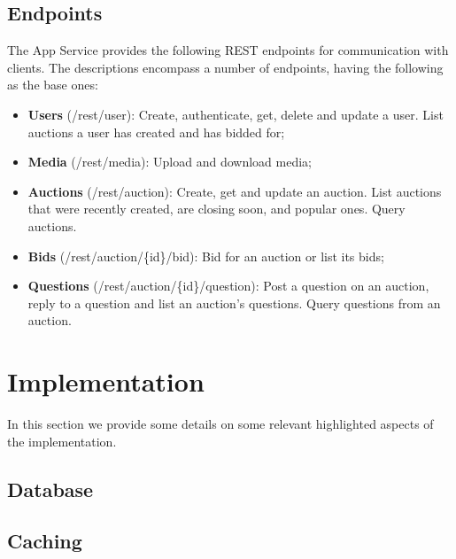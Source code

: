 \documentclass[runningheads]{llncs}
\begin{document}
\subsection{Endpoints}

The App Service provides the following REST endpoints for communication with clients. The descriptions encompass a number of endpoints, having the following as the base ones:

\begin{itemize}
    \item \textbf{Users} (/rest/user): Create, authenticate, get, delete and update a user. List auctions a user has created and has bidded for;
    \item \textbf{Media} (/rest/media): Upload and download media;
    \item \textbf{Auctions} (/rest/auction): Create, get and update an auction. List auctions that were recently created, are closing soon, and popular ones. Query auctions.
    \item \textbf{Bids} (/rest/auction/\{id\}/bid): Bid for an auction or list its bids;
    \item \textbf{Questions} (/rest/auction/\{id\}/question): Post a question on an auction, reply to a question and list an auction's questions. Query questions from an auction.
\end{itemize}


\section{Implementation}


In this section we provide some details on some relevant highlighted aspects of the implementation.

\subsection{Database}


\subsection{Caching}
\end{document}
